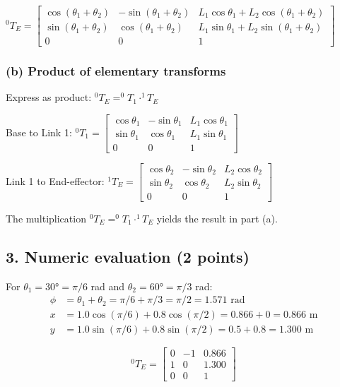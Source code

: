 \documentclass[11pt]{article}
\begin{document}
$^0 T_E = \begin{bmatrix}
\cos(\theta_1 + \theta_2) & -\sin(\theta_1 + \theta_2) & L_1\cos\theta_1 + L_2\cos(\theta_1 + \theta_2) \\
\sin(\theta_1 + \theta_2) & \cos(\theta_1 + \theta_2) & L_1\sin\theta_1 + L_2\sin(\theta_1 + \theta_2) \\
0 & 0 & 1
\end{bmatrix}$

\subsubsection*{(b) Product of elementary transforms}
Express as product: $^0 T_E = ^0 T_1 \cdot ^1 T_E$

Base to Link 1:
$^0 T_1 = \begin{bmatrix}
\cos\theta_1 & -\sin\theta_1 & L_1\cos\theta_1 \\
\sin\theta_1 & \cos\theta_1 & L_1\sin\theta_1 \\
0 & 0 & 1
\end{bmatrix}$

Link 1 to End-effector:
$^1 T_E = \begin{bmatrix}
\cos\theta_2 & -\sin\theta_2 & L_2\cos\theta_2 \\
\sin\theta_2 & \cos\theta_2 & L_2\sin\theta_2 \\
0 & 0 & 1
\end{bmatrix}$

The multiplication $^0 T_E = ^0 T_1 \cdot ^1 T_E$ yields the result in part (a).

\subsection*{3. Numeric evaluation (2 points)}
For $\theta_1 = 30° = \pi/6$ rad and $\theta_2 = 60° = \pi/3$ rad:
\begin{align}
\phi &= \theta_1 + \theta_2 = \pi/6 + \pi/3 = \pi/2 = 1.571 \text{ rad} \\
x &= 1.0\cos(\pi/6) + 0.8\cos(\pi/2) = 0.866 + 0 = 0.866 \text{ m} \\
y &= 1.0\sin(\pi/6) + 0.8\sin(\pi/2) = 0.5 + 0.8 = 1.300 \text{ m}
\end{align}

$$^0 T_E = \begin{bmatrix}
0 & -1 & 0.866 \\
1 & 0 & 1.300 \\
0 & 0 & 1
\end{bmatrix}$$
\end{document}
